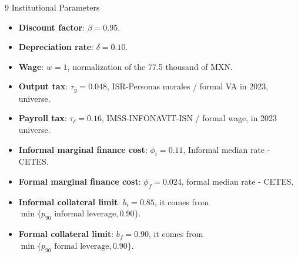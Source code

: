 \documentclass[11pt,aspectratio=169]{beamer}
\begin{document}

\begin{frame}{9 Institutional Parameters}

\begin{itemize}
    \item \textbf{Discount factor}: $\beta = 0.95$.
    \vspace{2mm}
    \item \textbf{Depreciation rate}: $\delta = 0.10$.
    \vspace{2mm}
    \item \textbf{Wage}: $w = 1$, normalization of the 77.5 thousand of MXN.
    \vspace{2mm}
    \item \textbf{Output tax}: $\tau_y = 0.048$, ISR-Personas morales / formal VA in 2023, universe.
    \vspace{2mm}
    \item \textbf{Payroll tax}: $\tau_{\ell} = 0.16$, IMSS-INFONAVIT-ISN / formal wage, in 2023 universe.
    \vspace{2mm}
    \item \textbf{Informal marginal finance cost}: $\phi_i = 0.11$, Informal median rate - CETES.
    \vspace{2mm}
    \item \textbf{Formal marginal finance cost}: $\phi_f = 0.024$, formal median rate - CETES.
    \vspace{2mm}
    \item \textbf{Informal collateral limit}: $b_i = 0.85$, it comes from $\min\{p_{90} \text{ informal leverage},0.90\}$.
    \vspace{2mm}
    \item \textbf{Formal collateral limit}: $b_f = 0.90$, it comes from $\min\{p_{90} \text{ formal leverage},0.90\}$.
\end{itemize}

\end{frame}

\end{document}
